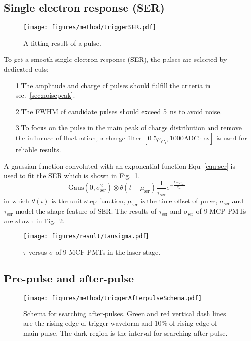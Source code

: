 \subsection{Single electron response (SER)}
\begin{figure}
    \centering
    \texttt{[image: figures/method/triggerSER.pdf]}
    \caption{A fitting result of a pulse.}
    \label{fig:triggerser}
\end{figure}
To get a smooth single electron response (SER), the pulses are selected by dedicated cuts:
\begin{itemize}
    \item[1] The amplitude and charge of pulses should fulfill the criteria in sec.~\ref{sec:noisepeak}.
    \item[2] The FWHM of candidate pulses should exceed \SI{5}{ns} to avoid noise.
    \item[3] To focus on the pulse in the main peak of charge distribution and remove the influence of fluctuation, a charge filter $[0.5\mu_{C_1}, 1000\mathrm{ADC\cdot ns}]$ is used for reliable results.
\end{itemize}

A gaussian function convoluted with an exponential function Equ~\eqref{equ:ser} is used to fit the SER which is shown in Fig.~\ref{fig:triggerser}.
\begin{equation}
    \label{equ:ser}
    \mathrm{Gaus}(0,\sigma_{\mathrm{ser}}^2)\otimes\theta(t-\mu_{\mathrm{ser}})\frac{1}{\tau_{\mathrm{ser}}}e^{-\frac{t-\mu_{\mathrm{ser}}}{\tau_{\mathrm{ser}}}}
\end{equation}
in which $\theta(t)$ is the unit step function, $\mu_{\mathrm{ser}}$ is the time offset of pulse, $\sigma_{\mathrm{ser}}$ and $\tau_{\mathrm{ser}}$ model the shape feature of SER. The results of $\tau_{\mathrm{ser}}$ and $\sigma_{\mathrm{ser}}$ of 9 MCP-PMTs are shown in Fig.~\ref{fig:sigmaCompare}.
\begin{figure}[!htbp]
    \centering
    \texttt{[image: figures/result/tausigma.pdf]}
    \caption{$\tau$ versus $\sigma$ of 9 MCP-PMTs in the laser stage.}
    \label{fig:sigmaCompare}
\end{figure}


\subsection{Pre-pulse and after-pulse}

\begin{figure}
    \centering
    \texttt{[image: figures/method/triggerAfterpulseSchema.pdf]}
    \caption{Schema for searching after-pulses. Green and red vertical dash lines are the rising edge of trigger waveform and 10\% of rising edge of main pulse. The dark region is the interval for searching after-pulse.}
    \label{fig:afterpulseSchema}
\end{figure}

